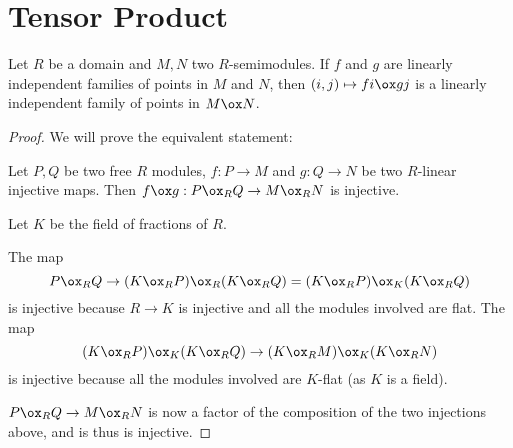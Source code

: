 \section{Tensor Product}


\begin{lemma}
  \label{0-tensor-lin-indep}
  \uses{}
  \leanok
  \mathlibok

  Let $R$ be a domain and $M, N$ two $R$-semimodules.
  If $f$ and $g$ are linearly independent families of points in $M$ and $N$, then $(i, j) \mapsto f i \ox g j$ is a linearly independent family of points in $M \ox N$.
\end{lemma}
\begin{proof}
  \uses{}
  \leanok
  We will prove the equivalent statement:

  Let $P, Q$ be two free $R$ modules, $f : P \to M$ and $g : Q \to N$ be two $R$-linear injective maps.
  Then $f \ox g : P \ox_R Q \to M \ox_R N$ is injective.

  Let $K$ be the field of fractions of $R$.

  The map
  \[ P \ox_R Q \to (K \ox_R P) \ox_R (K \ox_R Q) = (K \ox_R P) \ox_K (K \ox_R Q) \]
  is injective because $R \to K$ is injective and all the modules involved are flat.
  The map
  \[ (K \ox_R P) \ox_K (K \ox_R Q) \to (K \ox_R M) \ox_K (K \ox_R N) \]
  is injective because all the modules involved are $K$-flat (as $K$ is a field).

  $P \ox_R Q \to M \ox_R N$ is now a factor of the composition of the two injections above, and is thus is injective.
\end{proof}
